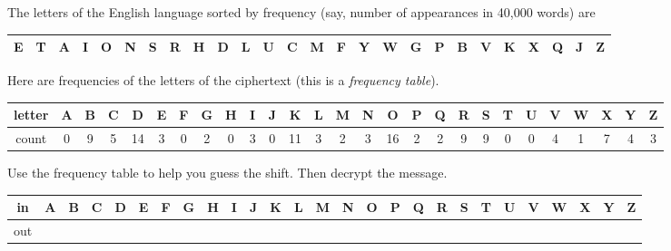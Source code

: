 \documentclass[12pt]{article}
\begin{document}
\begin{enumerate}
The letters of the English language sorted by frequency (say, number of appearances in 40,000 words) are

\hspace*{-1cm}
{\footnotesize
\begin{tabular}{|c|c|c|c|c|c|c|c|c|c|c|c|c|c|c|c|c|c|c|c|c|c|c|c|c|c|}
\hline
 E&T&A&I&O&N&S&R&H&D&L&U&C&M&F&Y&W&G&P&B&V&K&X&Q&J&Z\\  %
\hline
\end{tabular}
}

Here are frequencies of the letters of the ciphertext (this is a \emph{frequency table}).

\hspace*{-1cm}
{\scriptsize
\begin{tabular}{|c|c|c|c|c|c|c|c|c|c|c|c|c|c|c|c|c|c|c|c|c|c|c|c|c|c|c|}
\hline
letter& A&B&C&D&E&F&G&H&I&J&K&L&M&N&O&P&Q&R&S&T&U&V&W&X&Y&Z\\  \hline \hline
count&0&9&5&14&3&0&2&0&3&0&11&3&2&3&16&2&2&9&9&0&0&4&1&7&4&3\\
\hline
\end{tabular}
}

Use the frequency table to help you guess the shift. Then decrypt the message.

\hspace*{-1cm}
{\scriptsize
\begin{tabular}{|c|c|c|c|c|c|c|c|c|c|c|c|c|c|c|c|c|c|c|c|c|c|c|c|c|c|c|}
\hline
in& A&B&C&D&E&F&G&H&I&J&K&L&M&N&O&P&Q&R&S&T&U&V&W&X&Y&Z\\  \hline
out& & & &&&&&&&&&&&&&&&&&&&&&&&\\[12pt]
\hline
\end{tabular}
}




\vspace{-1.5cm}

{\Large
\linespread{1.5}
\selectfont
\so{

}}
\end{enumerate}
\end{document}
